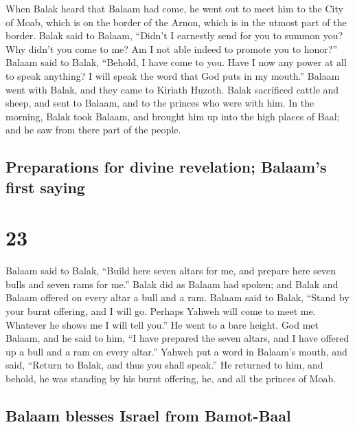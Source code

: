  When Balak heard that Balaam had come, he went out to
meet him to the City of Moab, which is on the border of the Arnon, which
is in the utmost part of the border.  Balak said to
Balaam, ``Didn't I earnestly send for you to summon you? Why didn't you
come to me? Am I not able indeed to promote you to honor?''
 Balaam said to Balak, ``Behold, I have come to you. Have
I now any power at all to speak anything? I will speak the word that God
puts in my mouth.''  Balaam went with Balak, and they
came to Kiriath Huzoth.  Balak sacrificed cattle and
sheep, and sent to Balaam, and to the princes who were with him.
 In the morning, Balak took Balaam, and brought him up
into the high places of Baal; and he saw from there part of the people.

\hypertarget{preparations-for-divine-revelation-balaams-first-saying}{%
\subsection{Preparations for divine revelation; Balaam's first
saying}\label{preparations-for-divine-revelation-balaams-first-saying}}

\hypertarget{section-22}{%
\section{23}\label{section-22}}

 Balaam said to Balak, ``Build here seven altars for me,
and prepare here seven bulls and seven rams for me.'' 
Balak did as Balaam had spoken; and Balak and Balaam offered on every
altar a bull and a ram.  Balaam said to Balak, ``Stand by
your burnt offering, and I will go. Perhaps Yahweh will come to meet me.
Whatever he shows me I will tell you.'' He went to a bare height.
 God met Balaam, and he said to him, ``I have prepared the
seven altars, and I have offered up a bull and a ram on every altar.''
 Yahweh put a word in Balaam's mouth, and said, ``Return
to Balak, and thus you shall speak.''  He returned to him,
and behold, he was standing by his burnt offering, he, and all the
princes of Moab.

\hypertarget{balaam-blesses-israel-from-bamot-baal}{%
\subsection{Balaam blesses Israel from
Bamot-Baal}\label{balaam-blesses-israel-from-bamot-baal}}

